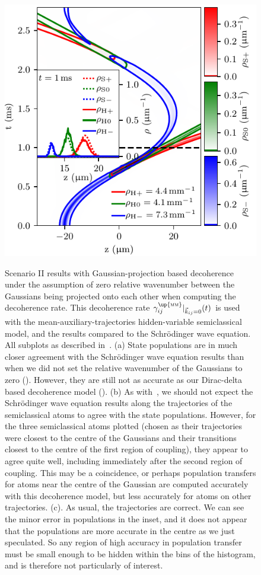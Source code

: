 {\begin{figure}
{    \includegraphics{figures/hidden_variables/hvsc_aux_mirror_bad_gamma/trajectories.pdf}
    }
    \caption{Scenario II results with Gaussian-projection based decoherence under the assumption of zero relative wavenumber between the Gaussians being projected onto each other when computing the decoherence rate. This decoherence rate $\gamma^\up{\textsc{mm}}_{ij}|_{\vec k_{ij} = 0}(t)$ is used with the mean-auxiliary-trajectories hidden-variable semiclassical model, and the results compared to the Schr\"odinger wave equation. All subplots as described in~. (a) State populations are in much closer agreement with the Schr\"odinger wave equation results than when we did not set the relative wavenumber of the Gaussians to zero (). However, they are still not as accurate as our Dirac-delta based decoherence model (). (b) As with~, we should not expect the Schr\"odinger wave equation results along the trajectories of the semiclassical atoms to agree with the state populations. However, for the three semiclassical atoms plotted (chosen as their trajectories were closest to the centre of the Gaussians and their transitions closest to the centre of the first region of coupling), they appear to agree quite well, including immediately after the second region of coupling. This may be a coincidence, or perhaps population transfers for atoms near the centre of the Gaussian are computed accurately with this decoherence model, but less accurately for atoms on other trajectories. (c). As usual, the trajectories are correct. We can see the minor error in populations in the inset, and it does not appear that the populations are more accurate in the centre as we just speculated. So any region of high accuracy in population transfer must be small enough to be hidden within the bins of the histogram, and is therefore not particularly of interest.}\label{fig:bad_gamma}
\end{figure}
\restoregeometry}

